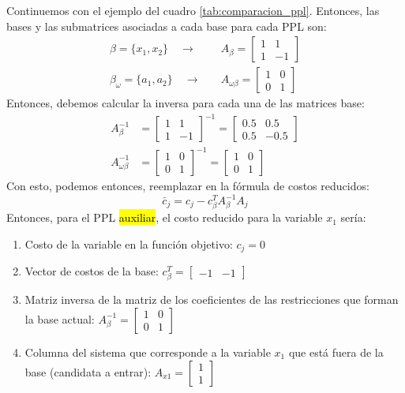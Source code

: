 Continuemos con el ejemplo del cuadro \ref{tab:comparacion_ppl}. Entonces, las bases y las submatrices asociadas a cada base para cada PPL son:
\begin{align*}
  \beta = \{x_1,x_2\} \quad \rightarrow& \quad A_\beta = \begin{bmatrix} 1 & 1\\ 1 & -1 \end{bmatrix}\\[4pt]
  \beta_\omega = \{a_1, a_2\} \quad \rightarrow& \quad A_{\omega\beta} = \begin{bmatrix} 1 & 0\\ 0 & 1 \end{bmatrix}
\end{align*}
Entonces, debemos calcular la inversa para cada una de las matrices base:
\begin{align*}
  A_\beta^{-1} &= \begin{bmatrix} 1 & 1\\ 1 & -1 \end{bmatrix}^{-1} = \begin{bmatrix} 0.5 & 0.5\\ 0.5 & -0.5 \end{bmatrix}\\[4pt]
  A_{\omega\beta}^{-1} &= \begin{bmatrix} 1 & 0\\ 0 & 1 \end{bmatrix}^{-1} = \begin{bmatrix} 1 & 0\\ 0 & 1 \end{bmatrix}
\end{align*}
Con esto, podemos entonces, reemplazar en la fórmula de costos reducidos:
\[
  \bar{c}_j = c_j - c_\beta^T A_\beta^{-1} A_j
\]
Entonces, para el PPL \hl{auxiliar}, el costo reducido para la variable \(x_1\) sería:
\begin{enumerate}
  \item Costo de la variable en la función objetivo: \(c_j = 0\)
  \item Vector de costos de la base: \(c_\beta^T = \begin{bmatrix} -1 & -1 \end{bmatrix}\)
  \item Matriz inversa de la matriz de los coeficientes de las restricciones que forman la base actual: \(A_\beta^{-1} = \begin{bmatrix} 1 & 0\\ 0 & 1 \end{bmatrix}\)
  \item Columna del sistema que corresponde a la variable \(x_1\) que está fuera de la base (candidata a entrar): \(A_{x1} = \begin{bmatrix} 1\\ 1 \end{bmatrix}\)
\end{enumerate}
